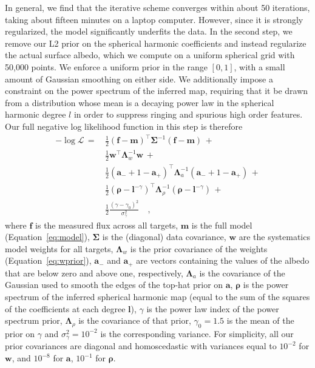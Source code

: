 \documentclass[modern]{aastex62}
\begin{document}
In general, we find that the iterative scheme converges within about 50 
iterations, taking about fifteen minutes on a laptop computer. However, since it 
is strongly regularized, the model significantly
underfits the data. In the second step, we remove our L2 prior on the spherical
harmonic coefficients and instead regularize the actual surface albedo, which
we compute on a uniform spherical grid with 50,000 points. We enforce a 
uniform prior in the range $[0, 1]$, with a small amount of Gaussian smoothing on either 
side. We additionally impose a constraint on the power spectrum of the
inferred map, requiring that it be drawn from a distribution whose mean
is a decaying power law in the spherical harmonic degree $l$ in order
to suppress ringing and spurious high order features.
Our full negative log likelihood function in this step is therefore
%
\begin{align}
    \label{eq:nll}
    -\log\mathcal{L} \, = \, 
        &\frac{1}{2}(\mathbf{f} - \mathbf{m})^\top \boldsymbol{\Sigma}^{-1} (\mathbf{f} - \mathbf{m}) \, + \nonumber \\
        &\frac{1}{2}\mathbf{w}^\top \boldsymbol{\Lambda}_w^{-1} \mathbf{w} \, + \nonumber \\
        &\frac{1}{2}(\mathbf{a_-} + 1 - \mathbf{a_+})^\top \boldsymbol{\Lambda}_a^{-1} (\mathbf{a_-} + 1 - \mathbf{a_+}) \, + \nonumber \\
        &\frac{1}{2}(\boldsymbol{\rho} - \boldsymbol{l}^{-\gamma})^\top \boldsymbol{\Lambda}_\rho^{-1} (\boldsymbol{\rho} - \boldsymbol{l}^{-\gamma}) \, + \nonumber \\
        &\frac{1}{2} \frac{(\gamma - \gamma_0)^2}{\sigma_\gamma^2}
        \quad,
\end{align}
%
where $\mathbf{f}$ is the measured flux across all targets,
$\mathbf{m}$ is the full model (Equation~\ref{eq:model}),
$\boldsymbol{\Sigma}$ is the (diagonal) data covariance, 
$\mathbf{w}$ are the systematics model weights for all targets,
$\boldsymbol{\Lambda}_w$ is the prior covariance of the weights
(Equation~\ref{eq:wprior}), $\mathbf{a_-}$ and $\mathbf{a_+}$ are
vectors containing the values of the albedo that are below zero and above one, 
respectively, $\boldsymbol{\Lambda}_a$ is the covariance of the Gaussian
used to smooth the edges of the top-hat prior on $\mathbf{a}$,
$\boldsymbol{\rho}$ is the power spectrum of the inferred spherical harmonic map
(equal to the sum of the squares of the coefficients at each degree $\boldsymbol{l}$),
$\gamma$ is the power law index of the power spectrum prior, $\boldsymbol{\Lambda}_\rho$ is the
covariance of that prior, $\gamma_0 = 1.5$ is the mean of the prior on $\gamma$
and $\sigma_\gamma^2 = 10^{-2}$ is the corresponding variance.
%
For simplicity, all our prior covariances are diagonal and
homoscedastic with variances equal to $10^{-2}$ for $\mathbf{w}$, and
$10^{-8}$ for $\mathbf{a}$, $10^{-1}$ for $\boldsymbol{\rho}$.
\end{document}
